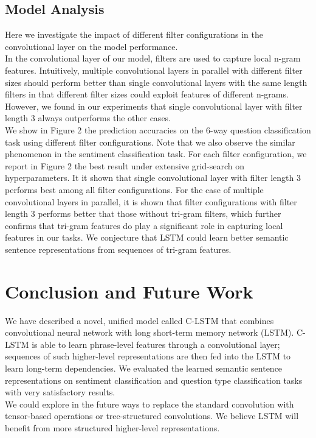 \documentclass[11pt,letterpaper]{article}
\begin{document}
\subsection{Model Analysis}
Here we investigate the impact of different filter
configurations in the convolutional layer on the model performance. \\
\indent In the convolutional layer of our model, filters are used to
capture local n-gram features. Intuitively, multiple convolutional
layers in parallel with different filter sizes should perform better
than single convolutional layers with the same length filters in that
different filter sizes could exploit features of different n-grams.
However, we found in our experiments that single convolutional layer
with filter length 3 always outperforms the other cases.\\
\indent We show in Figure 2 the prediction accuracies on the 6-way
question classification task using different filter configurations. Note
that we also observe the similar phenomenon in the sentiment
classification task. For each filter configuration, we report in
Figure 2 the best result under extensive grid-search on hyperparameters.
It it shown that single convolutional layer with filter length 3 performs
best among all filter configurations. For the case of multiple
convolutional layers in parallel, it is shown that filter configurations
with filter length 3 performs better that those without tri-gram
filters, which further confirms that tri-gram features do play a
significant role in capturing local features in our tasks. We conjecture
that LSTM could learn better semantic sentence representations from
sequences of tri-gram features.









\section{Conclusion and Future Work}
We have described a novel, unified model called C-LSTM that combines
convolutional neural network with long short-term memory network (LSTM).
C-LSTM is able to learn phrase-level features through a
convolutional layer; sequences of such higher-level
representations are then fed into the LSTM to learn long-term dependencies. We
evaluated the learned semantic sentence representations on sentiment
classification and question type classification tasks with very
satisfactory results.\\
\indent We could explore in the future ways to replace the standard
convolution with tensor-based operations or tree-structured convolutions.
We believe LSTM will benefit from more structured higher-level
representations.



\end{document}
